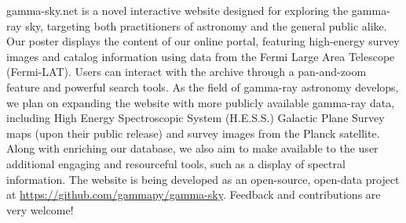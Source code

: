 gamma-sky.net is a novel interactive website designed for exploring the gamma-ray sky, targeting both practitioners of astronomy and the general public alike. Our poster displays the content of our online portal, featuring high-energy survey images and catalog information using data from the Fermi Large Area Telescope (Fermi-LAT).  Users can interact with the archive through a pan-and-zoom feature and powerful search tools. As the field of gamma-ray astronomy develops, we plan on expanding the website with more publicly available gamma-ray data, including High Energy Spectroscopic System (H.E.S.S.) Galactic Plane Survey maps (upon their public release) and survey images from the Planck satellite. Along with enriching our database, we also aim to make available to the user additional engaging and resourceful tools, such as a display of spectral information. The website is being developed as an open-source, open-data project at \url{https://github.com/gammapy/gamma-sky}. Feedback and contributions are very welcome!
